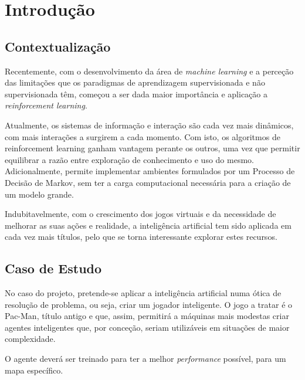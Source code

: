 \documentclass[runningheads]{article}
\begin{document}
\newpage

\tableofcontents

\newpage

\section{Introdução}

\subsection{Contextualização}
\par Recentemente, com o desenvolvimento da área de \textit{machine learning} e a perceção das limitações que os paradigmas de aprendizagem supervisionada e não supervisionada têm, começou a ser dada maior importância e aplicação a \textit{reinforcement learning}.
\par Atualmente, os sistemas de informação e interação são cada vez mais dinâmicos, com mais interações a surgirem a cada momento. Com isto, os algoritmos de reinforcement learning ganham vantagem perante os outros, uma vez que permitir equilibrar a razão entre exploração de conhecimento e uso do mesmo. Adicionalmente, permite implementar ambientes formulados por um Processo de Decisão de Markov, sem ter a carga computacional necessária para a criação de um modelo grande.
\par Indubitavelmente, com o crescimento dos jogos virtuais e da necessidade de melhorar as suas ações e realidade, a inteligência artificial tem sido aplicada em cada vez mais títulos, pelo que se torna interessante explorar estes recursos.

\subsection{Caso de Estudo}
\par No caso do projeto, pretende-se aplicar a inteligência artificial numa ótica de resolução de problema, ou seja, criar um jogador inteligente. O jogo a tratar é o Pac-Man, título antigo e que, assim, permitirá a máquinas mais modestas criar agentes inteligentes que, por conceção, seriam utilizáveis em situações de maior complexidade.
\par O agente deverá ser treinado para ter a melhor \textit{performance} possível, para um mapa específico.
\end{document}
